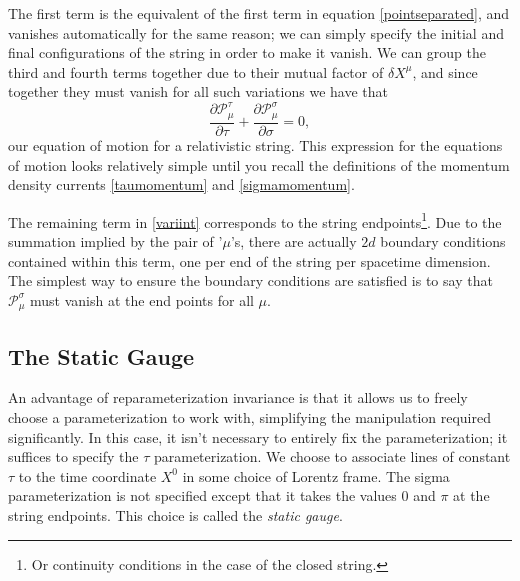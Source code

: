 \documentclass[a4paper,12pt]{article}
\numberwithin{equation}{section}
\begin{document}
The first term is the equivalent of the first term in equation \ref{pointseparated}, and vanishes automatically for the same reason; we can simply specify the initial and final configurations of the string in order to make it vanish. We can group the third and fourth terms together due to their mutual factor of $\delta X^\mu$, and since together they must vanish for all such variations we have that
\begin{equation}\label{stringeom}
\frac{\partial \mathcal{P}_\mu^\tau}{\partial \tau} + \frac{\partial \mathcal{P}_\mu^\sigma}{\partial \sigma} = 0,
\end{equation}
our equation of motion for a relativistic string. This expression for the equations of motion looks relatively simple until you recall the definitions of the momentum density currents \ref{taumomentum} and \ref{sigmamomentum}.

 The remaining term in \ref{variint} corresponds to the string endpoints\footnote{Or continuity conditions in the case of the closed string.}. Due to the summation implied by the pair of '$\mu$'s, there are actually $2d$ boundary conditions contained within this term, one per end of the string per spacetime dimension. The simplest way to ensure the boundary conditions are satisfied is to say that $\mathcal{P}^\sigma_\mu$ must vanish at the end points for all $\mu$.  
\subsection{The Static Gauge}\label{staticgauge}
An advantage of reparameterization invariance is that it allows us to freely choose a parameterization to work with, simplifying the manipulation required significantly. In this case, it isn't necessary to entirely fix the parameterization; it suffices to specify the $\tau$ parameterization. We choose to associate lines of constant $\tau$ to the time coordinate $X^0$ in some choice of Lorentz frame. The sigma parameterization is not specified except that it takes the values $0$ and $\pi$ at the string endpoints. This choice is called the \emph{static gauge}.
\end{document}
